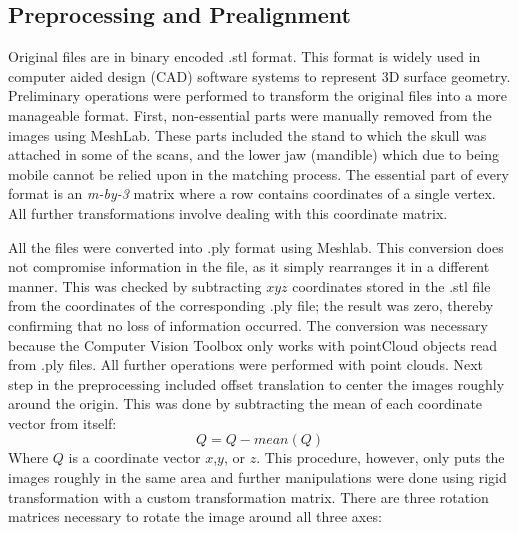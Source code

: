 \documentclass[a4paper]{article}
\begin{document}

\subsection{Preprocessing and Prealignment} %
Original files are in binary encoded {\selectfont .stl} format. This format is widely used in computer aided design (CAD) software systems to represent 3D surface geometry. Preliminary operations were performed to transform the original files into a more manageable format. First, non-essential parts were manually removed from the images using MeshLab. These parts included the stand to which the skull was attached in some of the scans, and the lower jaw (mandible) which due to being mobile cannot be relied upon in the matching process. The essential part of every format is an \emph{m-by-3} matrix where a row contains coordinates of a single vertex. All further transformations involve dealing with this coordinate matrix.

All the files were converted into {\selectfont .ply} format using Meshlab. This conversion does not compromise information in the file, as it simply rearranges it in a different manner. This was checked by subtracting $xyz$ coordinates  stored in the {\selectfont .stl} file from the coordinates of the corresponding {\selectfont .ply} file; the result was zero, thereby confirming that no loss of information occurred. The conversion was necessary because the Computer Vision Toolbox only works with {\selectfont pointCloud} objects read from {\selectfont .ply} files. All further operations were performed with point clouds. 
\newpage
Next step in the preprocessing included offset translation to center the images roughly around the origin. This was done by subtracting the mean of each coordinate vector from itself:
\begin{equation}
Q = Q - mean(Q)
\end{equation}
Where $Q$ is a coordinate vector $x$,$y$, or $z$. This procedure, however, only puts the images roughly in the same area and further manipulations were done using rigid transformation with a custom transformation matrix. There are three rotation matrices necessary to rotate the image around all three axes:
\end{document}
